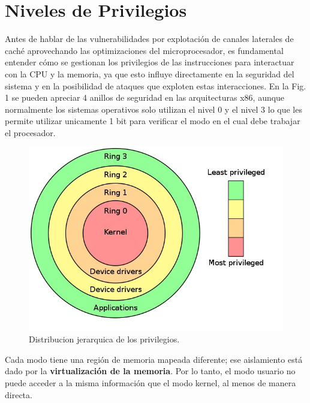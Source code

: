 \documentclass[lettersize,compsoc]{IEEEtran}
\begin{document}
\section{Niveles de Privilegios}
Antes de hablar de las vulnerabilidades por explotación de canales laterales de caché aprovechando las optimizaciones del microprocesador, es fundamental entender cómo se gestionan los privilegios de las instrucciones para interactuar con la CPU y la memoria, ya que esto influye directamente en la seguridad del sistema y en la posibilidad de ataques que exploten estas interacciones.
\newline
En la Fig. 1 se pueden apreciar 4 anillos de seguridad en las arquitecturas x86, aunque normalmente los sistemas operativos solo utilizan el nivel 0 y el nivel 3 lo que les permite utilizar unicamente 1 bit para verificar el modo en el cual debe trabajar el procesador.
\begin{figure}[h]
  \centering
  \includegraphics[width=\linewidth]{../rings.jpg}
  \caption{\small Distribucion jerarquica de los  privilegios.}
  \label{fig:etiqueta}
\end{figure}
\newline
Cada modo tiene una región de memoria mapeada diferente; ese aislamiento está dado por la \textbf{virtualización de la memoria}. Por lo tanto, el modo usuario no puede acceder a la misma información que el modo kernel, al menos de manera directa.
\end{document}

